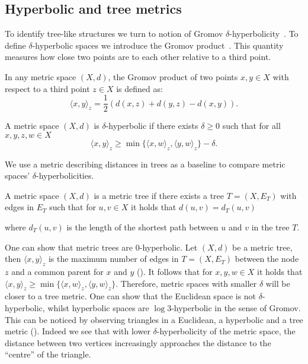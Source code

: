 \subsection{Hyperbolic and tree metrics}\label{sec:hyperbolicTreeMetrics}
To identify tree-like structures we turn to notion of Gromov $\delta$-hyperbolicity~\cite{gromov1987hyperbolic}\cite{adcock2013tree}\cite{chen2013hyperbolicity}. To define $\delta$-hyperbolic spaces we introduce the Gromov product~\cite{gromov1987hyperbolic}. This quantity measures how close two points are to each other relative to a third point.  

\begin{definition}
    In any metric space $(X,d)$, the Gromov product of two points $x,y\in X$ with respect to a third point $z\in X$ is defined as:
    \begin{equation*}
        \langle x,y \rangle_z = \frac{1}{2}\left(d(x,z) + d(y,z) - d(x,y)\right).
    \end{equation*}
\end{definition}

\begin{definition}
    A metric space $(X,d)$ is $\delta$-hyperbolic if there exists $\delta\geq0$ such that for all $x,y,z,w\in X$
    \begin{equation*}
        \langle x,y\rangle_z \geq \min\{\langle x,w\rangle_z, \langle y, w\rangle_z\} - \delta.
    \end{equation*}
\end{definition}

We use a metric describing distances in trees as a baseline to compare metric spaces' $\delta$-hyperbolicities.

\begin{definition}
    A metric space $(X,d)$ is a metric tree if there exists a tree $T=(X,E_T)$ with edges in $E_T$ such that for $u,v\in X$ it holds that $d(u,v)=d_T(u,v)$
\end{definition}
where $d_T(u,v)$ is the length of the shortest path between $u$ and $v$ in the tree $T$. 
 


One can show that metric trees are $0$-hyperbolic. Let $(X,d)$ be a metric tree, then $\langle x, y\rangle_z$ is the maximum number of edges in $T=(X,E_T)$ between the node $z$ and a common parent for $x$ and $y$ (). It follows that for $x,y,w\in X$ it holds that $\langle x,y\rangle_z \geq \min\{\langle x,w\rangle_z, \langle y, w\rangle_z\}$. Therefore, metric spaces with smaller $\delta$ will be closer to a tree metric. One can show that the Euclidean space is not $\delta$-hyperbolic, whilst hyperbolic spaces are $\log 3$-hyperbolic in the sense of Gromov. This can be noticed by observing triangles in a Euclidean, a hyperbolic and a tree metric (). Indeed we see that with lower $\delta$-hyperbolicity of the metric space, the distance between two vertices increasingly approaches the distance to the ``centre'' of the triangle.

